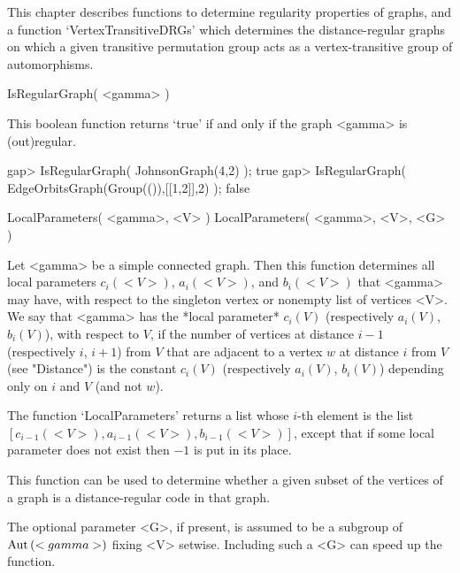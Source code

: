 %
%
%
%
\def\GRAPE{\sf GRAPE}
\def\nauty{\it nauty}
\def\Aut{{\rm Aut}\,}


This chapter describes functions to determine regularity properties of
graphs, and a function `VertexTransitiveDRGs' which determines the
distance-regular graphs on which a given transitive permutation group
acts as a vertex-transitive group of automorphisms.


\>IsRegularGraph( <gamma> )

This boolean function returns `true'  if and only if the graph <gamma> is
(out)regular.

\beginexample
gap> IsRegularGraph( JohnsonGraph(4,2) );
true
gap> IsRegularGraph( EdgeOrbitsGraph(Group(()),[[1,2]],2) );
false 
\endexample


\>LocalParameters( <gamma>, <V> )
\>LocalParameters( <gamma>, <V>, <G> )

Let <gamma> be a simple connected graph.  Then this function determines
all local parameters $c_i(<V>)$, $a_i(<V>)$, and $b_i(<V>)$ that <gamma>
may have, with respect to the singleton vertex or nonempty list of
vertices <V>.  We say that <gamma> has the *local parameter* $c_i(V)$
(respectively $a_i(V)$, $b_i(V)$), with respect to $V$, if the number
of vertices at distance $i-1$ (respectively $i$, $i+1$) from $V$ that
are adjacent to a vertex $w$ at distance $i$ from $V$ (see "Distance")
is the constant $c_i(V)$ (respectively $a_i(V)$, $b_i(V)$) depending
only on $i$ and $V$ (and not $w$).

The function `LocalParameters' returns a list whose $i$-th element is
the list $[c_{i-1}(<V>), a_{i-1}(<V>), b_{i-1}(<V>)]$, except that if
some local parameter does not exist then $-1$ is put in its place.

This function can be used to determine whether a given subset of the
vertices of a graph is a distance-regular code in that graph.

The optional parameter <G>, if present, is assumed to be a subgroup of
$\Aut(<gamma>)$ fixing <V> setwise. Including such a <G> can speed up
the function.

